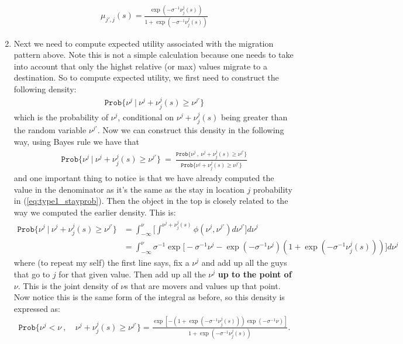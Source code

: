 \documentclass[pdftex,11pt]{article}
\begin{document}
\begin{enumerate}
\begin{align}
\mu_{j',j}(s) = \frac{\exp(-\sigma^{-1}\nu_j^{j}(s))}{1+\exp(-\sigma^{-1}\nu_j^{j}(s))}
\end{align}
\item Next we need to compute expected utility associated with the migration pattern above. Note this is not a simple calculation because one needs to take into account that only the highst relative (or max) values migrate to a destination. So to compute expected utility, we first need to construct the following density:
\begin{align}
\mathtt{Prob}\{ \nu^{j} \ | \ \nu^{j} + \nu_j^{j}(s) \geq \nu^{j'} \}
\end{align}
which is the probability of $\nu^{j}$, conditional on $\nu^{j} + \nu_j^{j}(s)$ being greater than the random variable $\nu^{j'}$. Now we can construct this density in the following way, using Bayes rule we have that
\begin{align}
\mathtt{Prob}\{ \nu^{j} \ | \ \nu^{j} + \nu_j^{j}(s) \geq \nu^{j'} \} \  = \  \frac{\mathtt{Prob}\{ \nu^{j} \ , \ \nu^{j} + \nu_j^{j}(s) \geq \nu^{j'} \}}{\mathtt{Prob}\{ \nu^{j} + \nu_j^{j}(s) \geq \nu^{j'} \}}
\end{align}
and one important thing to notice is that we have already computed the value in the denominator as it's the same as the stay in location $j$ probability in (\ref{eq:type1_stayprob}). Then the object in the top is closely related to the way we computed the earlier density. This is:
\begin{align}
\mathtt{Prob}\{ \nu^{j} \ | \ \nu^{j} + \nu_j^{j}(s) \geq \nu^{j'} \}  & = \int_{-\infty}^{\nu} \bigg [ \int^{\nu^{j} + \nu_j^{j}(s)} \phi(\nu^{j},\nu^{j'})d\nu^{j'} \bigg ] d\nu^{j} \\
& = \int_{-\infty}^{\nu}\sigma^{-1}\exp \big [-\sigma^{-1}\nu^{j} - \exp(-\sigma^{-1}\nu^{j})(1 +
\exp(-\sigma^{-1}\nu_j^{j}(s))) \big]d\nu^{j}
\end{align}
where (to repeat my self) the first line says, fix a $\nu^{j}$ and add up all the guys that go to $j$ for that given value. Then add up all the $\nu^{j}$ \textbf{up to the point of} $\nu$. This is the joint density of $\nu$s that are movers and values up that point. Now notice this is the same form of the integral as before, so this density is expressed as:
\begin{align}
\mathtt{Prob}\{ \nu^{j} < \nu \ , &\ \nu^{j} + \nu_j^{j}(s) \geq \nu^{j'} \}  = \frac{\exp[-(1+\exp(-\sigma^{-1}\nu_j^{j}(s)))\exp(-\sigma^{-1}\nu)]}{1+\exp(-\sigma^{-1}\nu_j^{j}(s))}.

\end{align}
\end{enumerate}
\end{document}
